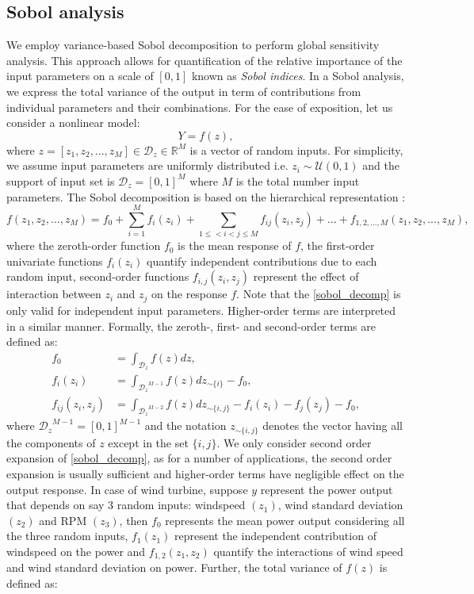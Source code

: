 \documentclass[review]{elsarticle}
\numberwithin{equation}{section}
\numberwithin{equation}{section}
\begin{document}
\subsection{Sobol analysis}
We employ variance-based Sobol decomposition to perform global sensitivity analysis. This approach allows for quantification of  the relative importance of the input parameters on a scale of $[0,1]$ known as \emph{Sobol indices}. In a Sobol analysis, we express the total variance of the output in term of contributions from individual parameters and their combinations. For the ease of exposition, let us consider a nonlinear model:
\begin{equation}\label{nonlinear_model}
Y = f({z}),
\end{equation}
where ${z} = [z_1, z_2, ..., z_M]\in \mathcal{D}_{z}\in \mathbb{R}^M$ is a vector of random  inputs. For simplicity, we assume input parameters are uniformly distributed i.e. $z_i \sim \mathcal{U}(0,1)$ and the support of input set is $\mathcal{D}_{z}  =  [0,1]^M$ where $M$ is the total number input parameters. The Sobol decomposition is based on the hierarchical representation \cite{RSmith}:
\begin{equation}\label{sobol_decomp}
f(z_1, z_2, ..., z_M) = f_0+\sum_{i=1}^M f_i(z_i) + \sum_{1\leq<i<j\leq M} f_{ij}(z_i,z_j) + ... + f_{1, 2, ..., M}(z_1, z_2, ..., z_M),
\end{equation}
where the zeroth-order function $f_0$ is the mean response of $f$, the first-order univariate functions $f_i(z_i)$ quantify independent contributions due to each random input, second-order functions $f_{i,j}(z_i,z_j)$ represent the effect of interaction between $z_i$ and $z_j$ on the response $f$. Note that the \eqref{sobol_decomp} is only valid for independent input parameters. Higher-order terms are interpreted in a similar manner. Formally, the zeroth-, first- and second-order terms are defined as:
\begin{align}\label{sobol_terms}
f_0 &= \int_{\mathcal{D}_{z}}f(z)dz,\\
f_i(z_i) &= \int_{{\mathcal{D}_{z}}^{M-1}}f(z)dz_{\sim \{i\}} - f_0,\\
f_{ij}(z_i,z_j) &= \int_{{\mathcal{D}_{z}}^{M-2}}f(z)dz_{\sim \{i,j\}} - f_i(z_i)  - f_j(z_j) - f_0,
\end{align}
where ${\mathcal{D}_{z}}^{M-1} = [0,1]^{M-1}$ and the notation $z_{\sim \{i,j\}}$ denotes the vector having all the components of ${z}$ except in the set $\{i,j\}$. We only consider second order expansion of \eqref{sobol_decomp}, as for a number of applications, the second order expansion is usually sufficient and higher-order terms have negligible effect on the output response. In case of wind turbine, suppose $y$ represent the power output that depends on say 3 random inputs:  windspeed $(z_1)$, wind standard deviation $(z_2)$ and RPM $(z_3)$, then $f_0$ represents the mean power output considering all the three random inputs, $f_1(z_1)$ represent the independent contribution of windspeed on the power and $f_{1,2}(z_1,z_2)$ quantify the interactions of wind speed and wind standard deviation on power. Further, the total variance of $f(z)$ is defined as:
\end{document}
